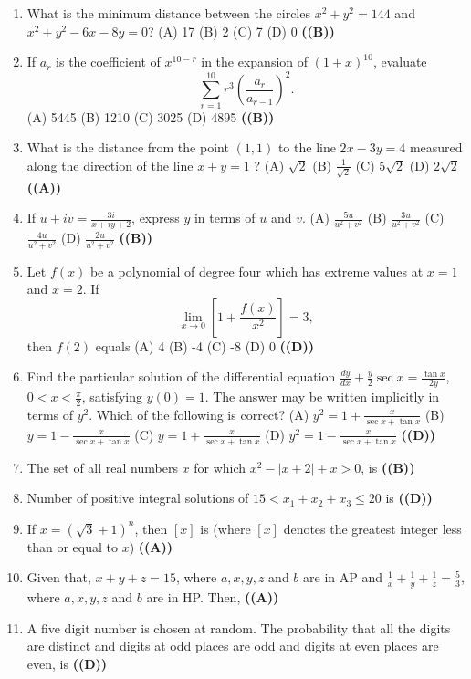 \documentclass{article}
\begin{document}
\begin{enumerate}
$f(x - y) = f(x)f(y) - f(a - x) f(a + y)$,
where $a$ is a constant and $f(0) = 1$. Then $f(2a - x) =$
(A) $-f(x)$
(B) $f(x)$
(C) $f(a) + f(a - x)$
(D) $f(-x)$ \hfill \textbf{((A))}
\item What is the minimum distance between the circles
$x^2 + y^2 = 144$ and $x^2 + y^2 - 6x - 8y = 0$?
(A) 17
(B) 2
(C) 7
(D) 0 \hfill \textbf{((B))}
\item If $a_r$ is the coefficient of $x^{10-r}$ in the expansion of $(1 + x)^{10}$, evaluate
$$ \sum_{r=1}^{10} r^3 \left(\frac{a_r}{a_{r-1}}\right)^2. $$
(A) 5445
(B) 1210
(C) 3025
(D) 4895 \hfill \textbf{((B))}
\item What is the distance from the point $(1, 1)$ to the line
$2x - 3y = 4$
measured along the direction of the line
$x + y = 1$ ?
(A) $\sqrt{2}$
(B) $\frac{1}{\sqrt{2}}$
(C) $5\sqrt{2}$
(D) $2\sqrt{2}$ \hfill \textbf{((A))}
\item If
$u + iv = \frac{3i}{x + iy+2}$,
express $y$ in terms of $u$ and $v$.
(A) $\frac{5u}{u^2 + v^2}$
(B) $\frac{3u}{u^2 + v^2}$
(C) $\frac{4u}{u^2 + v^2}$
(D) $\frac{2u}{u^2 + v^2}$ \hfill \textbf{((B))}
\item Let $f(x)$ be a polynomial of degree four which has extreme values at $x = 1$ and $x = 2$. If
$$ \lim_{x\to 0}\left[1+\frac{f(x)}{x^2}\right] = 3, $$
then $f(2)$ equals
(A) 4
(B) -4
(C) -8
(D) 0 \hfill \textbf{((D))}
\item Find the particular solution of the differential equation
$\frac{dy}{dx} + \frac{y}{2} \sec x = \frac{\tan x}{2 y}$,
$0 < x < \frac{\pi}{2}$,
satisfying $y(0) = 1$. The answer may be written implicitly in terms of $y^2$. Which of the following is correct?
(A) $y^2 = 1+\frac{x}{\sec x + \tan x}$
(B) $y = 1-\frac{x}{\sec x + \tan x}$
(C) $y = 1+\frac{x}{\sec x + \tan x}$
(D) $y^2 = 1-\frac{x}{\sec x + \tan x}$ \hfill \textbf{((D))}
\item The set of all real numbers $x$ for which $x^2 - |x + 2| + x > 0$, is \hfill \textbf{((B))}
\item Number of positive integral solutions of $15 < x_1 + x_2 + x_3 \leq 20$ is \hfill \textbf{((D))}
\item If $x = (\sqrt{3} + 1)^n$, then $[x]$ is (where $[x]$ denotes the greatest integer less than or equal to $x$) \hfill \textbf{((A))}
\item Given that, $x + y + z = 15$, where $a, x, y, z$ and $b$ are in AP and $\frac{1}{x} + \frac{1}{y} + \frac{1}{z} = \frac{5}{3}$, where $a, x, y, z$ and $b$ are in HP. Then, \hfill \textbf{((A))}
\item A five digit number is chosen at random. The probability that all the digits are distinct and digits at odd places are odd and digits at even places are even, is \hfill \textbf{((D))}

\end{enumerate}
\end{document}
